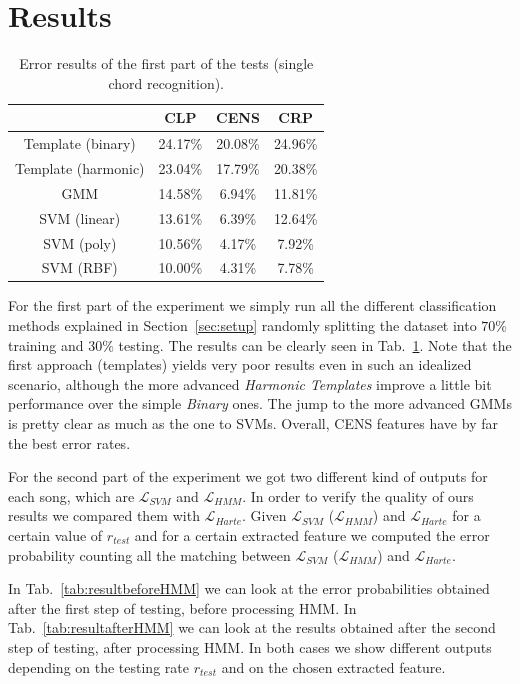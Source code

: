 \section{Results}
\label{sec:results}

\begin{table}[t]
	\centering
	\begin{tabular}{|c|c|c|c|}
		\hline 
		& CLP & CENS & CRP \\ 
		\hline 
		Template (binary) & 24.17\% & 20.08\% & 24.96\% \\
		\hline
		Template (harmonic) & 23.04\% & 17.79\% & 20.38\% \\
		\hline
		GMM & 14.58\% & 6.94\% & 11.81\% \\ 
		\hline 
		SVM (linear) & 13.61\% & 6.39\% & 12.64\% \\ 
		\hline 
		SVM (poly) & 10.56\% & 4.17\% & 7.92\% \\ 
		\hline 
		SVM (RBF) & 10.00\% & 4.31\% & 7.78\% \\ 
		\hline 
	\end{tabular}
	\caption{Error results of the first part of the tests (single chord recognition).}
	\label{tab:singleChordResults}
\end{table}

For the first part of the experiment we simply run all the different classification methods explained in Section~\ref{sec:setup} randomly splitting the dataset into $70\%$ training and $30\%$ testing. The results can be clearly seen in Tab.~\ref{tab:singleChordResults}. Note that the first approach (templates) yields very poor results even in such an idealized scenario, although the more advanced \textit{Harmonic Templates} improve a little bit performance over the simple \textit{Binary} ones. The jump to the more advanced GMMs is pretty clear as much as the one to SVMs. Overall, CENS features have by far the best error rates.

For the second part of the experiment we got two different kind of outputs for each song, which are $\mathcal{L}_{SVM}$ and $\mathcal{L}_{HMM}$. In order to verify the quality of ours results we compared them with  $\mathcal{L}_{Harte}$. Given $\mathcal{L}_{SVM}$ ($\mathcal{L}_{HMM}$) and $\mathcal{L}_{Harte}$ for a certain value of $r_{test}$ and for a certain extracted feature we computed the error probability counting all the matching between $\mathcal{L}_{SVM}$ ($\mathcal{L}_{HMM}$) and $\mathcal{L}_{Harte}$.

 In Tab.~\ref{tab:resultbeforeHMM} we can look at the error probabilities obtained after the first step of testing, before processing HMM. In Tab.~\ref{tab:resultafterHMM} we can look at the results obtained after the second step of testing, after processing HMM. In both cases we show different outputs depending on the testing rate $r_{test}$ and on the chosen extracted feature.

